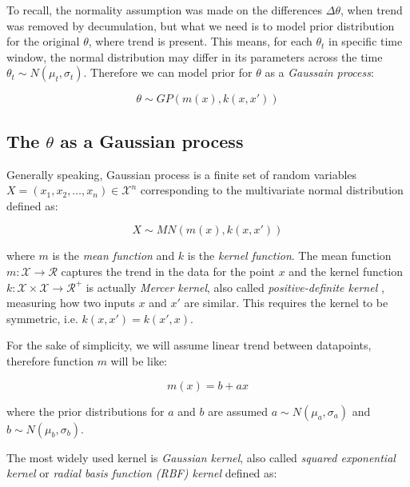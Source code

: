 \documentclass[
  digital, %
  oneside, %
  lof,     %
  lot,     %
]{fithesis4}
\begin{document}
To recall, the normality assumption was made 
on the differences $\Delta \theta$, when trend 
was removed by decumulation, but what we need 
is to model prior distribution for the original 
$\theta$, where trend is present. 
This means, for each $\theta_t$ in specific 
time window, the normal distribution may differ 
in its parameters across the time 
$\theta_t \sim N(\mu_t, \sigma_t)$. 
Therefore we can model prior for $\theta$ as a 
\textit{Gaussain process}:

\begin{equation}
\theta \sim GP \left( m \left( x \right), k \left( x, x' \right) \right)
\end{equation}



\subsection{The \texorpdfstring{$\theta$}{Lg} as a Gaussian process}

Generally speaking, Gaussian process 
\cite{rasmussen2004} is a finite set of random 
variables 
$X = (x_1, x_2, \dots, x_n) \in \mathcal{X}^n$ 
corresponding to the multivariate normal 
distribution defined as:

\begin{equation}
X \sim MN \left( m \left( x \right), k \left( x, x' \right) \right)
\end{equation}

where $m$ is the \textit{mean function} and $k$ is the 
\textit{kernel function}. 
The mean function 
$m : \mathcal{X} \to \mathcal{R}$ captures the 
trend in the data for the point $x$ and the 
kernel function 
$k : \mathcal{X} \times \mathcal{X} \to \mathcal{R}^{+}$ 
is actually \textit{Mercer kernel}, also called 
\textit{positive-definite kernel} \cite{murphy2021}, 
measuring how two inputs $x$ and $x'$ are similar. 
This requires the kernel to be symmetric, i.e. 
$k \left( x, x' \right) = k \left( x', x \right)$.

For the sake of simplicity, we will assume linear 
trend between datapoints, therefore function 
$m$ will be like:

\begin{equation}
m(x) = b + a x
\end{equation}

where the prior distributions for $a$ and $b$ 
are assumed 
$a \sim N \left( \mu_a, \sigma_a \right)$ and 
$b \sim N \left( \mu_b, \sigma_b \right)$.

The most widely used kernel is \textit{Gaussian kernel}, 
also called \textit{squared exponential kernel} or 
\textit{radial basis function (RBF) kernel} defined as:
\end{document}
